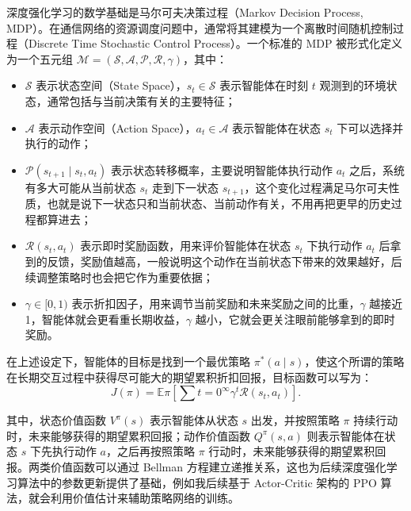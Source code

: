 深度强化学习的数学基础是马尔可夫决策过程（Markov Decision Process, MDP）。在通信网络的资源调度问题中，通常将其建模为一个离散时间随机控制过程（Discrete Time Stochastic Control Process）。一个标准的 MDP 被形式化定义为一个五元组 $\mathcal{M} = (\mathcal{S}, \mathcal{A}, \mathcal{P}, \mathcal{R}, \gamma)$，其中：

\begin{itemize}
\item
$\mathcal{S}$ 表示状态空间（State Space），$s_t \in \mathcal{S}$ 表示智能体在时刻 $t$ 观测到的环境状态，通常包括与当前决策有关的主要特征；
\item
$\mathcal{A}$ 表示动作空间（Action Space），$a_t \in \mathcal{A}$ 表示智能体在状态 $s_t$ 下可以选择并执行的动作；
\item
$\mathcal{P}(s_{t+1} \mid s_t, a_t)$ 表示状态转移概率，主要说明智能体执行动作 $a_t$ 之后，系统有多大可能从当前状态 $s_t$ 走到下一状态 $s_{t+1}$，这个变化过程满足马尔可夫性质，也就是说下一状态只和当前状态、当前动作有关，不用再把更早的历史过程都算进去；
\item
$\mathcal{R}(s_t, a_t)$ 表示即时奖励函数，用来评价智能体在状态 $s_t$ 下执行动作 $a_t$ 后拿到的反馈，奖励值越高，一般说明这个动作在当前状态下带来的效果越好，后续调整策略时也会把它作为重要依据；
\item
$\gamma \in [0, 1)$ 表示折扣因子，用来调节当前奖励和未来奖励之间的比重，$\gamma$ 越接近 1，智能体就会更看重长期收益，$\gamma$ 越小，它就会更关注眼前能够拿到的即时奖励。
\end{itemize}

在上述设定下，智能体的目标是找到一个最优策略 $\pi^*(a \mid s)$，使这个所谓的策略在长期交互过程中获得尽可能大的期望累积折扣回报，目标函数可以写为：
\begin{equation}
J(\pi) = \mathbb{E}{\pi} \left[ \sum{t=0}^{\infty} \gamma^t \mathcal{R}(s_t, a_t) \right].
\label{eq}
\end{equation}

其中，状态价值函数 $V^\pi(s)$ 表示智能体从状态 $s$ 出发，并按照策略 $\pi$ 持续行动时，未来能够获得的期望累积回报；动作价值函数 $Q^\pi(s, a)$ 则表示智能体在状态 $s$ 下先执行动作 $a$，之后再按照策略 $\pi$ 行动时，未来能够获得的期望累积回报。两类价值函数可以通过 Bellman 方程建立递推关系，这也为后续深度强化学习算法中的参数更新提供了基础，例如我后续基于 Actor-Critic 架构的 PPO 算法，就会利用价值估计来辅助策略网络的训练。










